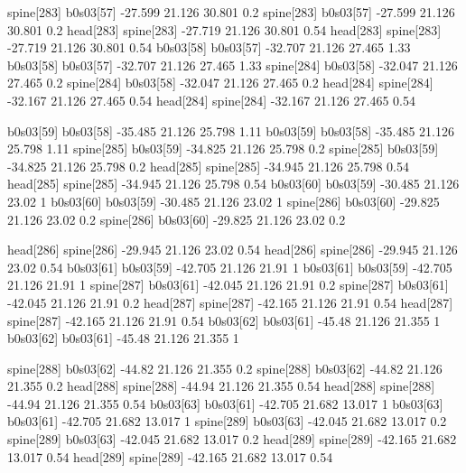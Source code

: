 spine[283]    b0s03[57]    -27.599    21.126    30.801    0.2
spine[283]    b0s03[57]    -27.599    21.126    30.801    0.2
head[283]    spine[283]    -27.719    21.126    30.801    0.54
head[283]    spine[283]    -27.719    21.126    30.801    0.54
b0s03[58]    b0s03[57]    -32.707    21.126    27.465    1.33
b0s03[58]    b0s03[57]    -32.707    21.126    27.465    1.33
spine[284]    b0s03[58]    -32.047    21.126    27.465    0.2
spine[284]    b0s03[58]    -32.047    21.126    27.465    0.2
head[284]    spine[284]    -32.167    21.126    27.465    0.54
head[284]    spine[284]    -32.167    21.126    27.465    0.54


b0s03[59]    b0s03[58]    -35.485    21.126    25.798    1.11
b0s03[59]    b0s03[58]    -35.485    21.126    25.798    1.11
spine[285]    b0s03[59]    -34.825    21.126    25.798    0.2
spine[285]    b0s03[59]    -34.825    21.126    25.798    0.2
head[285]    spine[285]    -34.945    21.126    25.798    0.54
head[285]    spine[285]    -34.945    21.126    25.798    0.54
b0s03[60]    b0s03[59]    -30.485    21.126    23.02    1
b0s03[60]    b0s03[59]    -30.485    21.126    23.02    1
spine[286]    b0s03[60]    -29.825    21.126    23.02    0.2
spine[286]    b0s03[60]    -29.825    21.126    23.02    0.2


head[286]    spine[286]    -29.945    21.126    23.02    0.54
head[286]    spine[286]    -29.945    21.126    23.02    0.54
b0s03[61]    b0s03[59]    -42.705    21.126    21.91    1
b0s03[61]    b0s03[59]    -42.705    21.126    21.91    1
spine[287]    b0s03[61]    -42.045    21.126    21.91    0.2
spine[287]    b0s03[61]    -42.045    21.126    21.91    0.2
head[287]    spine[287]    -42.165    21.126    21.91    0.54
head[287]    spine[287]    -42.165    21.126    21.91    0.54
b0s03[62]    b0s03[61]    -45.48    21.126    21.355    1
b0s03[62]    b0s03[61]    -45.48    21.126    21.355    1


spine[288]    b0s03[62]    -44.82    21.126    21.355    0.2
spine[288]    b0s03[62]    -44.82    21.126    21.355    0.2
head[288]    spine[288]    -44.94    21.126    21.355    0.54
head[288]    spine[288]    -44.94    21.126    21.355    0.54
b0s03[63]    b0s03[61]    -42.705    21.682    13.017    1
b0s03[63]    b0s03[61]    -42.705    21.682    13.017    1
spine[289]    b0s03[63]    -42.045    21.682    13.017    0.2
spine[289]    b0s03[63]    -42.045    21.682    13.017    0.2
head[289]    spine[289]    -42.165    21.682    13.017    0.54
head[289]    spine[289]    -42.165    21.682    13.017    0.54


